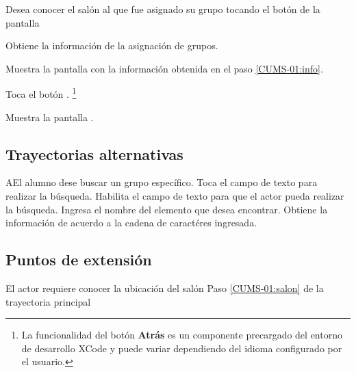  \begin{UCtrayectoria}
    \UCpaso[\UCactor] Desea conocer el salón al que fue asignado su grupo tocando el botón \botSalones de la pantalla 
    
     \UCpaso[\UCsist] Obtiene la información de la asignación de grupos. \label{CUMS-01:info}
    
    \UCpaso[\UCsist] Muestra la pantalla  con la información obtenida en el paso \ref{CUMS-01:info}. \label{CUMS-01:salon} 
    
    \UCpaso[\UCactor] Toca el botón . \footnote{La funcionalidad del botón \textbf{Atrás} es un componente precargado del entorno de desarrollo XCode y puede variar dependiendo del idioma configurado por el usuario.}
    
    \UCpaso[\UCsist] Muestra la pantalla .
    
%    
%    

\end{UCtrayectoria}

\subsection{Trayectorias alternativas}

%
\begin{UCtrayectoriaA}{A}{El alumno dese buscar un grupo específico.}
	\UCpaso[\UCactor] Toca el campo de texto para realizar la búsqueda.
	\UCpaso[\UCsist] Habilita el campo de texto para que el actor pueda realizar la búsqueda.
	\UCpaso[\UCactor] Ingresa el nombre del elemento que desea encontrar.
	\UCpaso[\UCsist] Obtiene la información de acuerdo a la cadena de caractéres ingresada. 
\end{UCtrayectoriaA}
 

\subsection{Puntos de extensión}
%
\UCExtensionPoint
{El actor requiere conocer la ubicación del salón}
{ Paso \ref{CUMS-01:salon} de la trayectoria principal}
{}

%
 